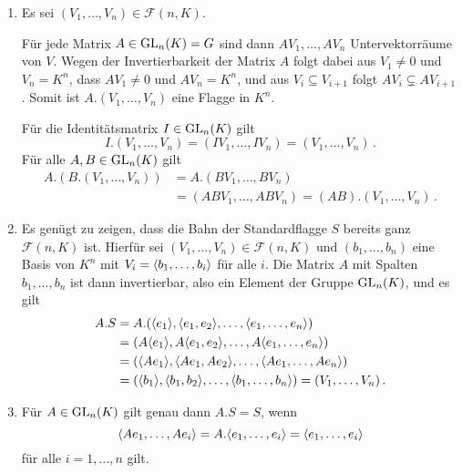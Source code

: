 \begin{solution}
  \begin{enumerate}
    \item
      Es sei $(V_1, \dotsc, V_n) \in \mathcal{F}(n,K)$.
      
      Für jede Matrix $A \in \operatorname{GL}_n(K) = G$ sind dann $A V_1, \dotsc, A V_n$ Untervektorräume von $V$.
      Wegen der Invertierbarkeit der Matrix $A$ folgt dabei aus $V_1 \neq 0$ und $V_n = K^n$, dass $A V_1 \neq 0$ und $A V_n = K^n$, und aus $V_i \subseteq V_{i+1}$ folgt $A V_i \subsetneq A V_{i+1}$.
      Somit ist $A.(V_1, \dotsc, V_n)$ eine Flagge in $K^n$.
      
      Für die Identitätsmatrix $I \in \operatorname{GL}_n(K)$ gilt
      \[
          I.(V_1, \dotsc, V_n)
        = (I V_1, \dotsc, I V_n)
        = (V_1, \dotsc, V_n) \,.
      \]
      Für alle $A, B \in \operatorname{GL}_n(K)$ gilt
      \begin{align*}
            A.(B.(V_1, \dotsc, V_n))
        &=  A.(B V_1, \dotsc, B V_n)  \\
        &=  (A B V_1, \dotsc, A B V_n)
         =  (AB).(V_1, \dotsc, V_n) \,.
      \end{align*}
      
    \item
      Es genügt zu zeigen, dass die Bahn der Standardflagge $S$ bereits ganz $\mathcal{F}(n,K)$ ist.
      Hierfür sei $(V_1, \dotsc, V_n) \in \mathcal{F}(n,K)$ und $(b_1, \dotsc, b_n)$ eine Basis von $K^n$ mit $V_i = \langle b_1, \dotsc, b_i\rangle$ für alle $i$.
      Die Matrix $A$ mit Spalten $b_1, \dotsc, b_n$ ist dann invertierbar, also ein Element der Gruppe $\operatorname{GL}_n(K)$, und es gilt
      \begin{align*}
            A.S
        &=  A.(\langle e_1\rangle, \langle e_1, e_2\rangle, \dotsc, \langle e_1, \dotsc, e_n\rangle)    \\
        &=  (A\langle e_1\rangle, A\langle e_1, e_2\rangle, \dotsc, A\langle e_1, \dotsc, e_n\rangle)   \\
        &=  (\langle Ae_1\rangle, \langle Ae_1, Ae_2\rangle, \dotsc, \langle Ae_1, \dotsc, Ae_n\rangle) \\
        &=  (\langle b_1\rangle, \langle b_1, b_2\rangle, \dotsc, \langle b_1, \dotsc, b_n\rangle)
         =  (V_1, \dotsc, V_n) \,.
      \end{align*}
      
    \item
      Für $A \in \operatorname{GL}_n(K)$ gilt genau dann $A.S = S$, wenn
      \[
          \langle A e_1, \dotsc, A e_i\rangle
        = A.\langle e_1, \dotsc, e_i\rangle
        = \langle e_1, \dotsc, e_i\rangle
      \]
      für alle $i = 1, \dotsc, n$ gilt.
      

\end{enumerate}
\end{solution}
